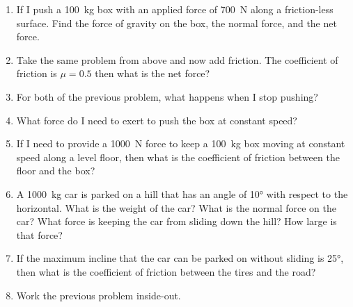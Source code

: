 \begin{enumerate}
\begin{enumerate}
\item If I accelerate the cup downwards with an acceleration of \SI{-1}{\meter \per \second^2}, then what force does my hand need to provide to the cup?\hugeskip
\end{enumerate}


\item If I push a \SI{100}{\kilogram} box with an applied force of \SI{700}{\newton} along a friction-less surface. Find the force of gravity on the box, the normal force, and the net force.\hugeskip

\item Take the same problem from above and now add friction. The coefficient of friction is $\mu=0.5$ then what is the net force?\hugeskip

\item For both of the previous problem, what happens when I stop pushing?

\item What force do I need to exert to push the box at constant speed?


\item If I need to provide a \SI{1000}{\newton} force to keep a \SI{100}{\kilogram} box moving at constant speed along a level floor, then what is the coefficient of friction between the floor and the box?\hugeskip

\item A \SI{1000}{\kilogram} car is parked on a hill that has an angle of \ang{10} with respect to the horizontal. What is the weight of the car? What is the normal force on the car? What force is keeping the car from sliding down the hill? How large is that force?\giantskip

\item If the maximum incline that the car can be parked on without sliding is \ang{25}, then what is the coefficient of friction between the tires and the road?\giantskip

\item Work the previous problem inside-out.\giantskip


\end{enumerate}
